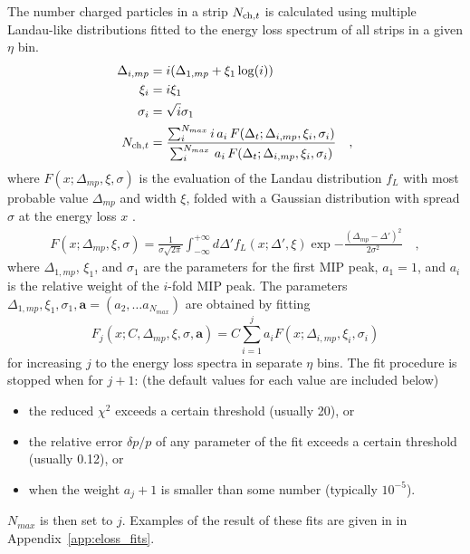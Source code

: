 \documentclass[11pt]{article}
\begin{document}
The number charged particles in a strip $\mult[,t]$ is calculated
using multiple Landau-like distributions fitted to the energy loss
spectrum of all strips in a given $\eta$ bin.
\begin{align}
  \Delta_{i,mp} &= i (\Delta_{1,mp}+ \xi_1 \log(i))\nonumber\\
  \xi_i         &= i\xi_1\nonumber\\
  \sigma_i      &= \sqrt{i}\sigma_1\nonumber\\
  \mult[,t]     &= \frac{\sum_i^{N_{max}}
    i\,a_i\,F(\Delta_t;\Delta_{i,mp},\xi_i,\sigma_i)}{
    \sum_i^{N_{max}}\,a_i\,F(\Delta_t;\Delta_{i,mp},\xi_i,\sigma_i)}\quad,
\end{align}
where $F(x;\Delta_{mp},\xi,\sigma)$ is the evaluation of the Landau
distribution $f_L$ with most probable value $\Delta_{mp}$ and width
$\xi$, folded with a Gaussian distribution with spread $\sigma$ at the
energy loss $x$ \cite{nim:b1:16,phyrev:a28:615}.
\begin{align}
  \label{eq:energy_response}
  F(x;\Delta_{mp},\xi,\sigma) = \frac{1}{\sigma \sqrt{2 \pi}}
  \int_{-\infty}^{+\infty} d\Delta' f_{L}(x;\Delta',\xi)
  \exp{-\frac{(\Delta_{mp}-\Delta')^2}{2\sigma^2}}\quad,
\end{align}
where $\Delta_{1,mp}$, $\xi_1$, and $\sigma_1$ are the parameters for
the first MIP peak, $a_1=1$, and $a_i$ is the relative weight of the
$i$-fold MIP peak.  The parameters $\Delta_{1,mp}, \xi_1,
\sigma_1, \mathbf{a} = \left(a_2, \ldots a_{N_{max}}\right)$ are
obtained by fitting 
$$
F_j(x;C,\Delta_{mp},\xi,\sigma,\mathbf{a}) = C 
\sum_{i=1}^{j} a_i F(x;\Delta_{i,mp},\xi_{i},\sigma_i) 
$$
for increasing $j$ to the energy loss spectra in separate $\eta$ bins.
The fit procedure is stopped when for $j+1$: (the default values for
each value are included below) 
\begin{itemize}
\item the reduced $\chi^2$ exceeds a certain threshold (usually 20), or
\item the relative error $\delta p/p$ of any parameter of the fit
  exceeds a certain threshold (usually 0.12), or 
\item when the weight $a_j+1$ is smaller than some number (typically
  $10^{-5}$). 
\end{itemize}
$N_{max}$ is then set to $j$.  Examples of the result of these fits
are given in  in Appendix~\ref{app:eloss_fits}.
\end{document}
